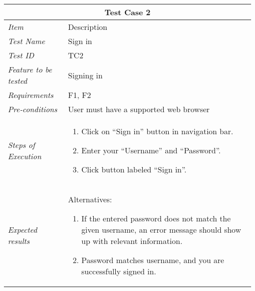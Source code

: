 %
\begin{minipage}{\linewidth}
\setlength{\tabcolsep}{15pt}
\centering
{}
\begin{tabular}{ |l|p{70mm}| }
	\hline
	\multicolumn{2}{|c|}{\cellcolor{gray!25} \textbf{Test Case 2}} \\
	\hline
	\it{\cellcolor{gray!25}Item} & {\cellcolor{gray!25} Description } \\
	\hline
	\it{\cellcolor{gray!25}Test Name } & Sign in \\ \hline
	\it{\cellcolor{gray!25}Test ID} & TC2 \\ \hline
	\it{\cellcolor{gray!25}Feature to be tested} & Signing in \\ \hline
	\it{\cellcolor{gray!25}Requirements} & F1, F2  \\ \hline
	\it{\cellcolor{gray!25}Pre-conditions} & User must have a supported web browser  \\ \hline
	\it{\cellcolor{gray!25}Steps of Execution} & \begin{enumerate}
	                                       \item Click on “Sign in” button in navigation bar.
	                                       \item Enter your “Username” and “Password”.
	                                       \item Click button labeled “Sign in”.
	                                     \end{enumerate} \\ \hline
	\it{\cellcolor{gray!25}Expected results} & Alternatives: 
	\begin{enumerate}[label=\alph*)]
	                                       \item If the entered password does not match the given username, an error message should show up with relevant information.
	                                       \item Password matches username, and you are successfully signed in.
	                                     \end{enumerate} \\
	\hline
\end{tabular}
\medskip
\end{minipage}
%
